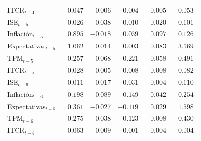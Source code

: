 \begin{table}[H]
\begin{tabular}{@{}lrrrrr@{}}
ITCR$_{t-4}$ & $-0.047$ & $-0.006$ & $-0.004$ & $0.005$ & $-0.053$ \\
\addlinespace
ISE$_{t-5}$ & $-0.026$ & $0.038$ & $-0.010$ & $0.020$ & $0.101$ \\
Inflación$_{t-5}$ & $0.895$ & $-0.018$ & $0.039$ & $0.097$ & $0.126$ \\
Expectativas$_{t-5}$ & $-1.062$ & $0.014$ & $0.003$ & $0.083$ & $-3.669$ \\
TPM$_{t-5}$ & $0.257$ & $0.068$ & $0.221$ & $0.058$ & $0.491$ \\
ITCR$_{t-5}$ & $-0.028$ & $0.005$ & $-0.008$ & $-0.008$ & $0.082$ \\
\addlinespace
ISE$_{t-6}$ & $0.011$ & $0.017$ & $0.031$ & $-0.004$ & $-0.110$ \\
Inflación$_{t-6}$ & $0.198$ & $0.089$ & $0.149$ & $0.042$ & $0.254$ \\
Expectativas$_{t-6}$ & $0.361$ & $-0.027$ & $-0.119$ & $0.029$ & $1.698$ \\
TPM$_{t-6}$ & $0.275$ & $-0.038$ & $-0.123$ & $0.008$ & $0.430$ \\
ITCR$_{t-6}$ & $-0.063$ & $0.009$ & $0.001$ & $-0.004$ & $-0.004$ \\
\bottomrule
\end{tabular}
\end{table}
